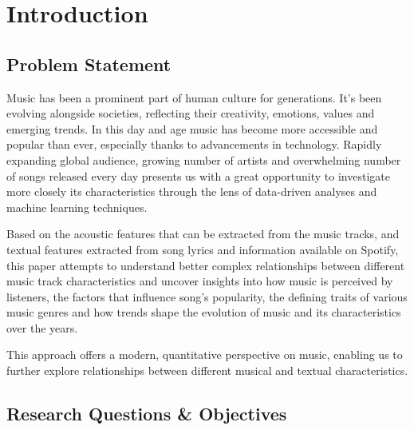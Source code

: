 \chapter{Introduction}
\label{cha:introduction}

\section{Problem Statement}
\label{sec:problemstatement}
Music has been a prominent part of human culture for generations. It's been
evolving alongside societies, reflecting their creativity, emotions, values and
emerging trends. In this day and age music has become more accessible and
popular than ever, especially thanks to advancements in technology. Rapidly
expanding global audience, growing number of artists and overwhelming number of
songs released every day presents us with a great opportunity to investigate
more closely its characteristics through the lens of data-driven analyses and
machine learning techniques. 

Based on the acoustic features that can be extracted from the music tracks, and
textual features extracted from song lyrics and information available on
Spotify, this paper attempts to understand better complex relationships between
different music track characteristics and uncover insights into how music is
perceived by listeners, the factors that influence song's popularity, the
defining traits of various music genres and how trends shape the evolution of
music and its characteristics over the years. 

This approach offers a modern, quantitative perspective on music, enabling us
to further explore relationships between different musical and textual
characteristics.






\section{Research Questions \& Objectives}
\label{sec:researchquestions}

